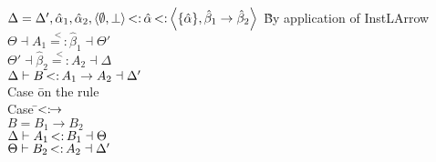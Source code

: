 \documentclass{article}
\newcommand{\st}{\ensuremath{\hspace{-1px}<:\hspace{-1px}}}
\newcommand{\alphahat}{\hat{\alpha}}
\newcommand{\betahat}{\hat{\beta}}
\newcommand{\instr}{\overset{<}{=:}}
\newcommand{\pair}[2]{\left<#1,#2\right>}
\begin{document}
\begin{tabbing}
\>\>$\Delta=\Delta',\alphahat_1,\alphahat_2,\pair{\emptyset}{\bot} \st \alphahat \st \pair{\{\alphahat\}}{\betahat_1 \rightarrow \betahat_2}$ \` By application of InstLArrow\\
\>\>$\Theta \dashv A_1 \instr \betahat_1 \dashv \Theta'$\\
\>\>$\Theta' \dashv \betahat_2 \instr A_2 \dashv \Delta$\\
\>\>$\Delta \vdash B \st A_1 \rightarrow A_2 \dashv \Delta'$\\
\>\>Case \=on the rule\\
\>\>\>Case \=$\st\rightarrow$\\
\>\>\>\>$B = B_1 \rightarrow B_2$\\
\>\>\>\>$\Delta \vdash A_1 \st B_1 \dashv \Theta$\\
\>\>\>\>$\Theta \vdash B_2 \st A_2 \dashv \Delta'$\\
\end{tabbing}
\end{document}
